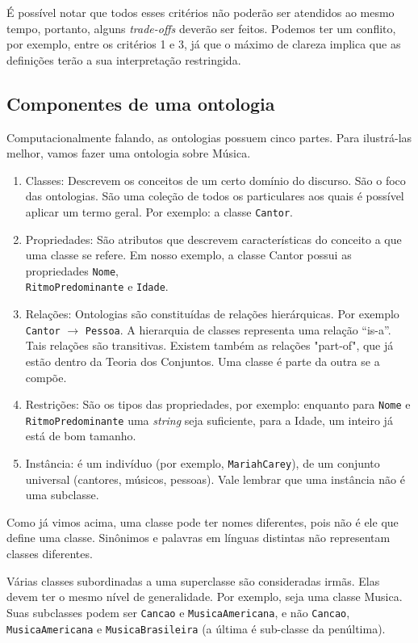 É possível notar que todos esses critérios não poderão ser atendidos ao mesmo tempo, portanto, alguns \textit{trade-offs} deverão ser feitos.
Podemos ter um conflito, por exemplo, entre os critérios 1 e 3, já que o máximo de clareza implica que as definições terão a sua interpretação restringida.

\subsection{Componentes de uma ontologia}

Computacionalmente falando, as ontologias possuem cinco partes. Para ilustrá-las melhor, vamos fazer uma ontologia sobre Música.

\begin{enumerate}
	\item Classes: Descrevem os conceitos de um certo domínio do discurso. São o foco das ontologias. São uma coleção de todos os particulares aos quais é possível aplicar um termo geral. Por exemplo: a classe \texttt{Cantor}.
	\item Propriedades: São atributos que descrevem características do conceito a que uma classe se refere. Em nosso exemplo, a classe Cantor possui as propriedades \texttt{Nome}, \\ \texttt{RitmoPredominante} e \texttt{Idade}.
	\item Relações: Ontologias são constituídas de relações hierárquicas. Por exemplo \texttt{Cantor} $ \to $ \texttt{Pessoa}. A hierarquia de classes representa uma relação “is-a”\cite{ontoFranca}. Tais relações são transitivas. Existem também as relações "part-of", que já estão dentro da Teoria dos Conjuntos. Uma classe é parte da outra se a compõe.
	\item Restrições: São os tipos das propriedades, por exemplo: enquanto para \texttt{Nome} e \\ \texttt{RitmoPredominante} uma \textit{string} seja suficiente, para a Idade, um inteiro já está de bom tamanho.
	\item Instância: é um indivíduo (por exemplo, \texttt{MariahCarey}), de um conjunto universal (cantores, músicos, pessoas). Vale lembrar que uma instância não é uma subclasse.
\end{enumerate}

Como já vimos acima, uma classe pode ter nomes diferentes, pois não é ele que define uma classe. Sinônimos e palavras em línguas distintas não representam classes diferentes.

Várias classes subordinadas a uma superclasse são consideradas irmãs. Elas devem ter o mesmo nível de generalidade. Por exemplo, seja uma classe Musica. Suas subclasses podem ser \texttt{Cancao} e \texttt{MusicaAmericana}, e não \texttt{Cancao}, \texttt{MusicaAmericana} e \texttt{MusicaBrasileira} (a última é sub-classe da penúltima).


